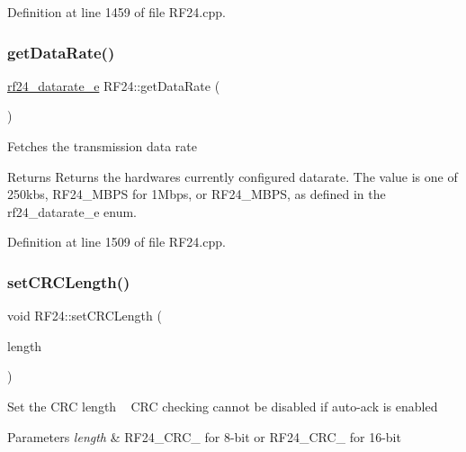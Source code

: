 Definition at line 1459 of file R\+F24.\+cpp.

\mbox{\label{classRF24_a72a7b11dafe8ffab6135f243decce0d7}} 
\subsubsection{\texorpdfstring{get\+Data\+Rate()}{getDataRate()}}
{\footnotesize\ttfamily \hyperlink{RF24_8h_a82745de4aa1251b7561564b3ed1d6522}{rf24\+\_\+datarate\+\_\+e} R\+F24\+::get\+Data\+Rate (\begin{DoxyParamCaption}\item[{void}]{ }\end{DoxyParamCaption})}

Fetches the transmission data rate

\begin{DoxyReturn}{Returns}
Returns the hardware\textquotesingle{}s currently configured datarate. The value is one of 250kbs, R\+F24\+\_\+M\+B\+PS for 1\+Mbps, or R\+F24\+\_\+M\+B\+PS, as defined in the rf24\+\_\+datarate\+\_\+e enum. 
\end{DoxyReturn}


Definition at line 1509 of file R\+F24.\+cpp.

\mbox{\label{classRF24_a89f626fc4a58dd997153bcc0f8198b9e}} 
\subsubsection{\texorpdfstring{set\+C\+R\+C\+Length()}{setCRCLength()}}
{\footnotesize\ttfamily void R\+F24\+::set\+C\+R\+C\+Length (\begin{DoxyParamCaption}\item[{\hyperlink{RF24_8h_adbe00719f3f835c82bd007081d040a7e}{rf24\+\_\+crclength\+\_\+e}}]{length }\end{DoxyParamCaption})}

Set the C\+RC length ~\newline
C\+RC checking cannot be disabled if auto-\/ack is enabled 
\begin{DoxyParams}{Parameters}
{\em length} & R\+F24\+\_\+\+C\+R\+C\+\_ for 8-\/bit or R\+F24\+\_\+\+C\+R\+C\+\_ for 16-\/bit \\
\hline
\end{DoxyParams}


